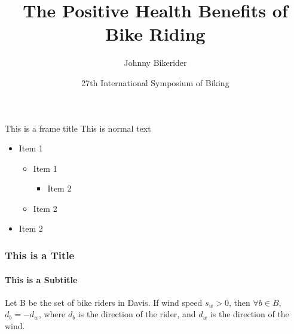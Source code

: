 \documentclass[aspectratio=169]{beamer}
\title{The Positive Health Benefits of Bike Riding}
\date[ISPN ’80]{27th International Symposium of Biking}
\author[Euclid]{Johnny Bikerider }
\institute{University of California, Davis }
\begin{document}
\begin{frame}
\titlepage
\end{frame}

\begin{frame}{This is a frame title}
\label{list}
This is normal text

\begin{itemize}
	\item Item 1
	\begin{itemize}
	\item Item 1
	\begin{itemize}
	\item Item 2
\end{itemize}
	\item Item 2
\end{itemize}
	\item Item 2
\end{itemize}
\end{frame}

\begin{frame}
\frametitle{This is a Title}
\framesubtitle{This is a Subtitle}

\begin{theorem}
Let B be the set of bike riders in Davis. If wind speed $s_{w} > 0$, then $\forall b \in B$, $d_{b} = - d_{w}$, where $d_{b}$ is the direction of the rider, and $d_{w}$ is the direction of the wind. 
\end{theorem}

                \hyperlink{list}{}
\end{frame}
\end{document}
